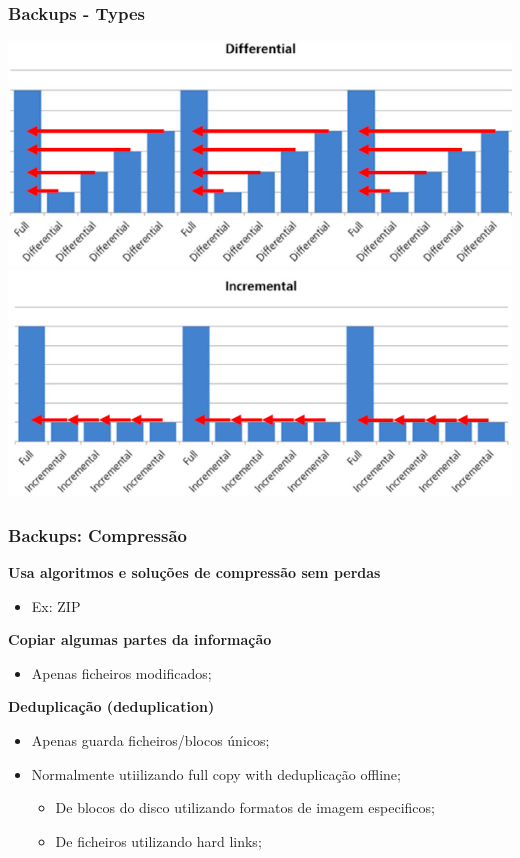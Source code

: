 \documentclass{article}
\begin{document}
\subsubsection{Backups - Types}

\begin{center}
  \includegraphics[scale=0.5]{30}
  \includegraphics[scale=0.5]{31}
\end{center}

\pagebreak

\subsubsection{Backups: Compressão}

\begin{flushleft}
  \textbf{Usa algoritmos e soluções de compressão sem perdas}
  \begin{itemize}
    \item Ex: ZIP
  \end{itemize}

  \textbf{Copiar algumas partes da informação}
  \begin{itemize}
    \item Apenas ficheiros modificados;
  \end{itemize}

  \textbf{Deduplicação (deduplication)}
  \begin{itemize}
    \item Apenas guarda ficheiros/blocos únicos;
    \item Normalmente utiilizando full copy with deduplicação offline;
    \begin{itemize}
      \item De blocos do disco utilizando formatos de imagem especificos;
      \item De ficheiros utilizando hard links;
    \end{itemize}
  \end{itemize}
\end{flushleft}
\end{document}
